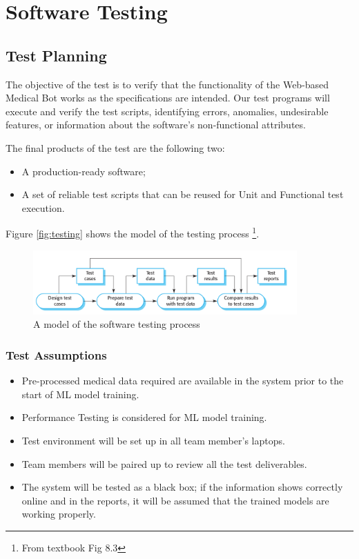 \documentclass[11pt,bibliography=totocnumbered]{article}
\begin{document}
  \section{Software Testing}
  
  \subsection{Test Planning}
  The objective of the test is to verify that the functionality of the Web-based Medical Bot works as the specifications are intended. Our test programs will execute and verify the test scripts,  identifying errors, anomalies, undesirable features, or information about the software's non-functional attributes.
  
  The final products of the test are the following two:
  \begin{itemize}
  	\item A production-ready software;
  	\item A set of reliable test scripts that can be reused for Unit and Functional test execution.
  \end{itemize}

	Figure \eqref{fig:testing} shows the model of the testing process \footnote{From textbook Fig 8.3}.
	
	\begin{figure}[H]
		\centering
		\includegraphics[width=0.9\textwidth]{figures/testing}
		\caption{A model of the software testing process}
		\label{fig:testing}
	\end{figure}
  
  \subsubsection{Test Assumptions}
  
  \begin{itemize}
  	\item Pre-processed medical data required are available in the system prior to the start of ML model training.
  	\item Performance Testing is considered for ML model training.
  	\item Test environment will be set up in all team member's laptops.
  	\item Team members will be paired up to review all the test deliverables.
  	\item The system will be tested as a black box; if the information shows correctly online and in the reports, it will be assumed that the trained models are working properly.
  \end{itemize}
  
\end{document}
